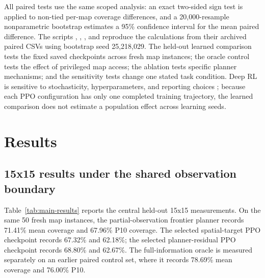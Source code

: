 \documentclass[10pt,letterpaper]{article}
\begin{document}
All paired tests use the same scoped analysis: an exact two-sided sign test is applied to non-tied per-map coverage differences, and a 20,000-resample nonparametric bootstrap estimates a 95\% confidence interval for the mean paired difference. The scripts , , , and  reproduce the calculations from their archived paired CSVs using bootstrap seed 25,218,029. The held-out learned comparison tests the fixed saved checkpoints across fresh map instances; the oracle control tests the effect of privileged map access; the ablation tests specific planner mechanisms; and the sensitivity tests change one stated task condition. Deep RL is sensitive to stochasticity, hyperparameters, and reporting choices \citep{henderson2018matters}; because each PPO configuration has only one completed training trajectory, the learned comparison does not estimate a population effect across learning seeds.

\section{Results}
\label{sec:results}

\subsection{15x15 results under the shared observation boundary}

Table~\ref{tab:main-results} reports the central held-out 15x15 measurements. On the same 50 fresh map instances, the partial-observation frontier planner records 71.41\% mean coverage and 67.96\% P10 coverage. The selected spatial-target PPO checkpoint records 67.32\% and 62.18\%; the selected planner-residual PPO checkpoint records 68.80\% and 62.67\%. The full-information oracle is measured separately on an earlier paired control set, where it records 78.69\% mean coverage and 76.00\% P10.
\end{document}
